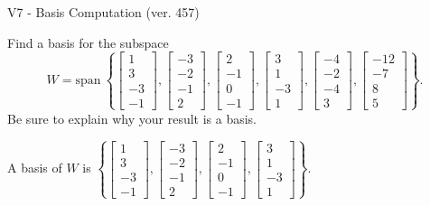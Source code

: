 \begin{exercise}
  \begin{exerciseTitle}V7 - Basis Computation (ver. 457)\end{exerciseTitle}
  \begin{exerciseStatement}
    Find a basis for the subspace 
\[W=\mathrm{span}\ \left\{\left[\begin{array}{r}
1 \\
3 \\
-3 \\
-1
\end{array}\right] , \left[\begin{array}{r}
-3 \\
-2 \\
-1 \\
2
\end{array}\right] , \left[\begin{array}{r}
2 \\
-1 \\
0 \\
-1
\end{array}\right] , \left[\begin{array}{r}
3 \\
1 \\
-3 \\
1
\end{array}\right] , \left[\begin{array}{r}
-4 \\
-2 \\
-4 \\
3
\end{array}\right] , \left[\begin{array}{r}
-12 \\
-7 \\
8 \\
5
\end{array}\right]\right\}.\]
 Be sure to explain why your result is a basis.


  \end{exerciseStatement}
  \begin{exerciseAnswer}
   A basis of \(W\) is  \(\left\{\left[\begin{array}{r}
1 \\
3 \\
-3 \\
-1
\end{array}\right] , \left[\begin{array}{r}
-3 \\
-2 \\
-1 \\
2
\end{array}\right] , \left[\begin{array}{r}
2 \\
-1 \\
0 \\
-1
\end{array}\right] , \left[\begin{array}{r}
3 \\
1 \\
-3 \\
1
\end{array}\right]\right\}\).
  


  \end{exerciseAnswer}
\end{exercise}